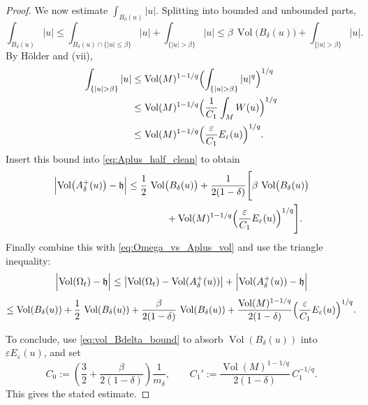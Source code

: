 \documentclass[10pt,a4paper]{amsart}
\begin{document}
\begin{proof}
\smallskip
We now estimate $\int_{B_\delta(u)}|u|$. Splitting into bounded and unbounded parts,
\[
\int_{B_\delta(u)}|u|
\le \int_{B_\delta(u)\cap\{|u|\le \beta\}}|u|+\int_{\{|u|>\beta\}}|u|
\le \beta\,\operatorname{Vol}\bigl(B_\delta(u)\bigr)+\int_{\{|u|>\beta\}}|u|.
\]
By H\"older and {\rm (vii)},
\begin{align*}
\int_{\{|u|>\beta\}} |u|
&\le \operatorname{Vol}(M)^{1-1/q}\Bigl(\int_{\{|u|>\beta\}} |u|^q\Bigr)^{1/q}\\
&\le \operatorname{Vol}(M)^{1-1/q}\Bigl(\frac{1}{C_1}\int_M W(u)\Bigr)^{1/q}\\
&\le \operatorname{Vol}(M)^{1-1/q}\Bigl(\frac{\varepsilon}{C_1}E_\varepsilon(u)\Bigr)^{1/q}.
\end{align*}
Insert this bound into \eqref{eq:Aplus_half_clean} to obtain
\[
\begin{aligned}
\Bigl|\operatorname{Vol}\bigl(A^+_\delta(u)\bigr)-\mathfrak h\Bigr|
&\le \frac12\,\operatorname{Vol}\bigl(B_\delta(u)\bigr)
+\frac{1}{2(1-\delta)}
\Biggl[
\beta\,\operatorname{Vol}\bigl(B_\delta(u)\bigr)\\
&\qquad\qquad
+ \operatorname{Vol}(M)^{1-1/q}\Bigl(\frac{\varepsilon}{C_1}E_\varepsilon(u)\Bigr)^{1/q}
\Biggr].
\end{aligned}
\]
Finally combine this with \eqref{eq:Omega_vs_Aplus_vol} and use the triangle inequality:
\[
\Bigl|\operatorname{Vol}(\Omega_t)-\mathfrak h\Bigr|
\le \bigl|\operatorname{Vol}(\Omega_t)-\operatorname{Vol}(A^+_\delta(u))\bigr|
     +\Bigl|\operatorname{Vol}(A^+_\delta(u))-\mathfrak h\Bigr|
\]
\[
\le \operatorname{Vol}(B_\delta(u))
+\frac12\,\operatorname{Vol}(B_\delta(u))
+\frac{\beta}{2(1-\delta)}\,\operatorname{Vol}(B_\delta(u))
+\frac{\operatorname{Vol}(M)^{1-1/q}}{2(1-\delta)}\Bigl(\frac{\varepsilon}{C_1}E_\varepsilon(u)\Bigr)^{1/q}.
\]

\smallskip
To conclude, use \eqref{eq:vol_Bdelta_bound} to absorb $\operatorname{Vol}(B_\delta(u))$ into $\varepsilon E_\varepsilon(u)$, and set
\[
C_0:=\left(\frac32+\frac{\beta}{2(1-\delta)}\right)\frac{1}{m_\delta},
\qquad
C_1':=\frac{\operatorname{Vol}(M)^{1-1/q}}{2(1-\delta)}\,C_1^{-1/q}.
\]
This gives the stated estimate.
\end{proof}
\end{document}
